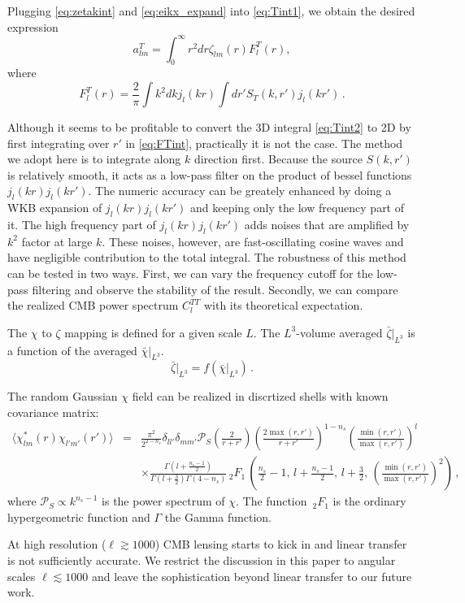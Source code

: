 Plugging \eqref{eq:zetakint} and \eqref{eq:eikx_expand} into \eqref{eq:Tint1}, we obtain the desired expression
\begin{equation}
a_{lm}^T = \int_0^\infty r^2dr \zeta_{lm}(r) F^T_l(r), \label{eq:Tint2}
\end{equation}
where
\begin{equation}
F^T_l(r) = \frac{2}{\pi} \int k^2dk j_l(kr) \int dr' S_T(k, r') j_l(kr') \, . \label{eq:FTint}
\end{equation}

Although it seems to be profitable to convert the 3D integral \eqref{eq:Tint2} to 2D by first integrating over $r'$ in \eqref{eq:FTint}, practically it is not the case. The method we adopt here is to integrate along $k$ direction first. Because the source $S(k, r')$ is relatively smooth, it acts as a low-pass filter on the product of bessel functions $j_l(kr)j_l(kr')$. The numeric accuracy can be greately enhanced by doing a WKB expansion of $j_l(kr)j_l(kr')$ and keeping only the low frequency part of it. The high frequency part of $j_l(kr)j_l(kr')$ adds noises that are amplified by $k^2$ factor at large $k$. These noises, however, are fast-oscillating cosine waves and have negligible contribution to the total integral. The robustness of this method can be tested in two ways. First, we can vary the frequency cutoff for the low-pass filtering and observe the stability of the result. Secondly, we can compare the realized CMB power spectrum $C_l^{TT}$ with its theoretical expectation. 

The $\chi$ to $\zeta$ mapping is defined for a given scale $L$. The $L^3$-volume averaged $\bar{\zeta}|_{L^3}$ is a function of the averaged $\bar{\chi}|_{L^3}$.
\begin{equation}
\bar{\zeta}\vert_{L^3}  = f\left(\bar{\chi}\vert_{L^3}\right)\, .
\end{equation}

The random Gaussian $\chi$ field can be realized in discrtized shells with known covariance matrix:
\begin{eqnarray}
  \langle \chi^*_{lm}(r) \chi_{l'm'}(r')\rangle &=& \frac{\pi^2}{2^{2-n_s}}  \delta_{ll'}\delta_{mm'} \mathcal{P}_S\left(\frac{2}{r+r'}\right) \left(\frac{2\max(r,r')}{r+r'}\right)^{1-n_s} \left(\frac{\min(r, r')}{\max(r,r')}\right)^l\\
 &&  \times \frac{\Gamma\left(l+\frac{n_s-1}{2}\right)}{\Gamma\left(l+\frac{3}{2}\right)\Gamma\left(4-n_s\right)} {\,_2F_1\,}\left( \frac{n_s}{2}-1,\, l+\frac{n_s-1}{2},\, l+ \frac{3}{2},\, \left(\frac{\min(r, r')}{\max(r,r')}\right)^2\right)     \nonumber \, ,
\end{eqnarray}
where $\mathcal{P}_S \propto k^{n_s-1}$ is the power spectrum of $\chi$.  The function $\,_2F_1$ is the ordinary hypergeometric function and $\Gamma$ the Gamma function.

At high resolution ($\ell \gtrsim 1000$) CMB lensing starts to kick in and linear transfer is not sufficiently accurate. We restrict the discussion in this paper to angular scales $\ell \lesssim 1000$ and leave the sophistication beyond linear transfer to our future work.


